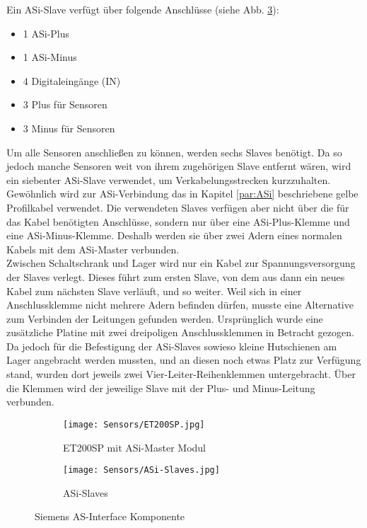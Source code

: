 Ein ASi-Slave verfügt über folgende Anschlüsse (siehe Abb. \ref{ASi-Slaves}):
\begin{itemize}
    \item 1 ASi-Plus
    \item 1 ASi-Minus
    \item 4 Digitaleingänge (IN)
    \item 3 Plus für Sensoren
    \item 3 Minus für Sensoren
\end{itemize}
Um alle Sensoren anschließen zu können, werden sechs Slaves benötigt.
Da so jedoch manche Sensoren weit von ihrem zugehörigen Slave entfernt wären, wird ein siebenter ASi-Slave verwendet, um Verkabelungsstrecken kurzzuhalten. Gewöhnlich wird zur ASi-Verbindung das in Kapitel \ref{par:ASi} beschriebene gelbe Profilkabel verwendet. Die verwendeten Slaves verfügen aber nicht über die für das Kabel benötigten Anschlüsse, sondern nur über eine ASi-Plus-Klemme und eine ASi-Minus-Klemme. Deshalb werden sie über zwei Adern eines normalen Kabels mit dem ASi-Master verbunden.\\
Zwischen Schaltschrank und Lager wird nur ein Kabel zur Spannungsversorgung der Slaves verlegt. Dieses führt zum ersten Slave, von dem aus dann ein neues Kabel zum nächsten Slave verläuft, und so weiter. Weil sich in einer Anschlussklemme nicht mehrere Adern befinden dürfen, musste eine Alternative zum Verbinden der Leitungen gefunden werden. Ursprünglich wurde eine zusätzliche Platine mit zwei dreipoligen Anschlussklemmen in Betracht gezogen. Da jedoch für die Befestigung der ASi-Slaves sowieso kleine Hutschienen am Lager angebracht werden mussten, und an diesen noch etwas Platz zur Verfügung stand, wurden dort jeweils zwei Vier-Leiter-Reihenklemmen untergebracht. Über die Klemmen wird der jeweilige Slave mit der Plus- und Minus-Leitung verbunden.

\begin{figure}[H]
    \centering
    \begin{subfigure}{.4\textwidth}
        \centering
        \texttt{[image: Sensors/ET200SP.jpg]}
        \caption{ET200SP mit ASi-Master Modul}
        \label{ET200SP}
    \end{subfigure}
    \begin{subfigure}{.4\textwidth}
        \centering
        \texttt{[image: Sensors/ASi-Slaves.jpg]}
        \caption{ASi-Slaves}
        \label{ASi-Slaves}
    \end{subfigure}
    \caption{Siemens AS-Interface Komponente}
\end{figure}

